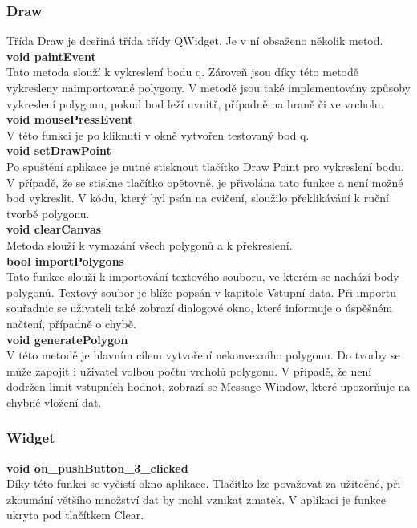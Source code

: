 \documentclass[a4paper, 12pt]{article}
\begin{document}
\subsubsection{Draw}
Třída Draw je dceřiná třída třídy QWidget. Je v ní obsaženo několik metod.\\

\textbf{void paintEvent}\\
Tato metoda slouží k vykreslení bodu q. Zároveň jsou díky této metodě vykresleny naimportované polygony. V metodě jsou také implementovány způsoby vykreslení polygonu, pokud bod leží uvnitř, případně na hraně či ve vrcholu.\\

\textbf{void mousePressEvent}\\
V této funkci je po kliknutí v okně vytvořen testovaný bod q.\\

\textbf{void setDrawPoint}\\
Po spuštění aplikace je nutné stisknout tlačítko Draw Point pro vykreslení bodu. V případě, že se stiskne tlačítko opětovně, je přivolána tato funkce a není možné bod vykreslit. V kódu, který byl psán na cvičení, sloužilo překlikávání k ruční tvorbě polygonu.\\

\textbf{void clearCanvas}\\
Metoda slouží k vymazání všech polygonů a k překreslení. \\

\textbf{bool importPolygons}\\
Tato funkce slouží k importování textového souboru, ve kterém se nachází body polygonů. Textový soubor je blíže popsán v kapitole Vstupní data. Při importu souřadnic se uživateli také zobrazí dialogové okno, které informuje o úspěšném načtení, případně o chybě.\\

\textbf{void generatePolygon}\\
V této metodě je hlavním cílem vytvoření nekonvexního polygonu. Do tvorby se může zapojit i uživatel volbou počtu vrcholů polygonu. V případě, že není dodržen limit vstupních hodnot, zobrazí se Message Window, které upozorňuje na chybné vložení dat.

\subsubsection{Widget}
\textbf{void on\_pushButton\_3\_clicked}\\
Díky této funkci se vyčistí okno aplikace. Tlačítko lze považovat za užitečné, při zkoumání většího množství dat by mohl vznikat zmatek. V aplikaci je funkce ukryta pod tlačítkem Clear.\\
\end{document}
